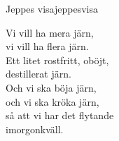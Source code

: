 \begin{song}{Jeppes visa}{jeppesvisa}
\begin{vers}
\repopen Vi vill ha mera järn,\\
vi vill ha flera järn.\\
Ett litet rostfritt, oböjt,\\
destillerat järn.\\
Och vi ska böja järn,\\
och vi ska kröka järn,\\
så att vi har det flytande\\
imorgonkväll. \repclose\\
\end{vers}
\end{song}
